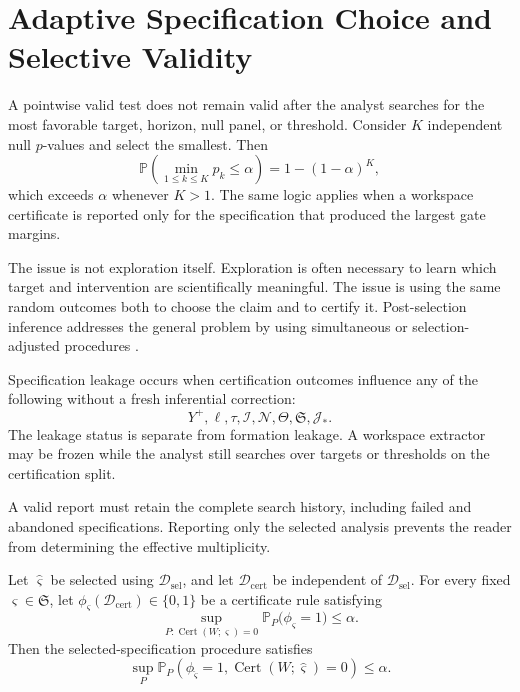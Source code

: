 \section{Adaptive Specification Choice and Selective Validity}

A pointwise valid test does not remain valid after the analyst searches for the
most favorable target, horizon, null panel, or threshold. Consider
\(K\) independent null \(p\)-values and select the smallest. Then
\[
\mathbb P\left(\min_{1\leq k\leq K}p_k\leq\alpha\right)
=
1-(1-\alpha)^K,
\]
which exceeds \(\alpha\) whenever \(K>1\). The same logic applies when a
workspace certificate is reported only for the specification that produced the
largest gate margins.

The issue is not exploration itself. Exploration is often necessary to learn
which target and intervention are scientifically meaningful. The issue is
using the same random outcomes both to choose the claim and to certify it.
Post-selection inference addresses the general problem by using simultaneous
or selection-adjusted procedures \cite{SRWT:BerkEtAl2013}.


\begin{SRWTdefinition}
Specification leakage occurs when certification outcomes influence any of the
following without a fresh inferential correction:
\[
Y^+,
\ell,
\tau,
\mathcal I,
\mathcal N,
\Theta,
\mathfrak S,
\mathcal J_*.
\]
The leakage status is separate from formation leakage. A workspace extractor
may be frozen while the analyst still searches over targets or thresholds on
the certification split.
\end{SRWTdefinition}

A valid report must retain the complete search history, including failed and
abandoned specifications. Reporting only the selected analysis prevents the
reader from determining the effective multiplicity.


\begin{SRWTtheorem}
\label{SRWT:thm:sample-split-spec-selection}
Let \(\widehat\varsigma\) be selected using
\(\mathcal D_{\mathrm{sel}}\), and let
\(\mathcal D_{\mathrm{cert}}\) be independent of
\(\mathcal D_{\mathrm{sel}}\). For every fixed
\(\varsigma\in\mathfrak S\), let
\(\phi_\varsigma(\mathcal D_{\mathrm{cert}})\in\{0,1\}\) be a certificate
rule satisfying
\[
\sup_{P:\operatorname{Cert}(W;\varsigma)=0}
\mathbb P_P\bigl(\phi_\varsigma=1\bigr)
\leq\alpha.
\]
Then the selected-specification procedure satisfies
\[
\boxed{
\sup_P
\mathbb P_P\left(
\phi_{\widehat\varsigma}=1,
\operatorname{Cert}(W;\widehat\varsigma)=0
\right)
\leq\alpha.
}
\]
\end{SRWTtheorem}

